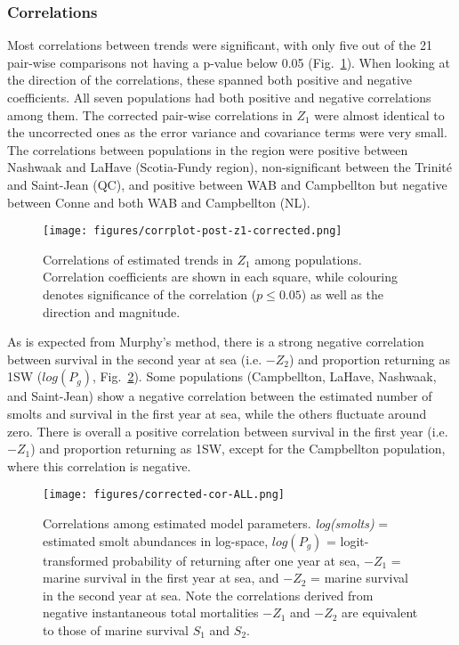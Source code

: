 \documentclass[12pt]{article}
\begin{document}
\subsubsection*{Correlations}

Most correlations between trends were significant, with only five out of the
21 pair-wise comparisons not having a p-value below 0.05
(Fig.~\ref{fig:s1-corr}). When looking at the direction of the correlations,
these spanned both positive and negative coefficients. All seven populations had both
positive and negative correlations among them.
The corrected pair-wise correlations in $Z_1$ were almost identical to the
uncorrected ones as the error variance and covariance terms were very small.
The correlations between populations in the region were positive between Nashwaak and LaHave (Scotia-Fundy region), non-significant between the Trinit\'{e} and Saint-Jean (QC), and positive
between WAB and Campbellton but negative between Conne and both WAB and Campbellton (NL).

\begin{figure}[htbp] \centering
    \texttt{[image: figures/corrplot-post-z1-corrected.png]} \caption{
        Correlations of estimated trends in $Z_1$ among populations. 
        Correlation coefficients are shown in each square, while colouring 
        denotes significance of the correlation ($p \leq 0.05$) as well as the direction and magnitude.}
\label{fig:s1-corr} 
\end{figure}

As is expected from Murphy's method, there is a strong negative correlation
between survival in the second year at sea (i.e. $-Z_2$) and proportion returning
as 1SW ($log(P_g)$, Fig.~\ref{fig:cor-params}). Some populations (Campbellton,
LaHave, Nashwaak, and Saint-Jean) show a negative correlation between the
estimated number of smolts and survival in the first year at sea, while the
others fluctuate around zero. There is overall a positive correlation between
survival in the first year (i.e. $-Z_1$) and proportion returning as 1SW,
except for the Campbellton population, where this correlation is negative.


\begin{figure}[htbp] \centering
    \texttt{[image: figures/corrected-cor-ALL.png]}
    \caption{Correlations among estimated model parameters. \emph{log(smolts)} = estimated smolt abundances in log-space, $log(P_g)$ = logit-transformed probability of
        returning after one year at sea, $-Z_1$ = marine survival in the first year at sea, and $-Z_2$ = marine survival in the second year at sea.
        Note the correlations derived from negative instantaneous total mortalities $-Z_1$ and $-Z_2$ are equivalent to those of marine survival $S_1$ and $S_2$.}
    \label{fig:cor-params} 
\end{figure}
\end{document}
